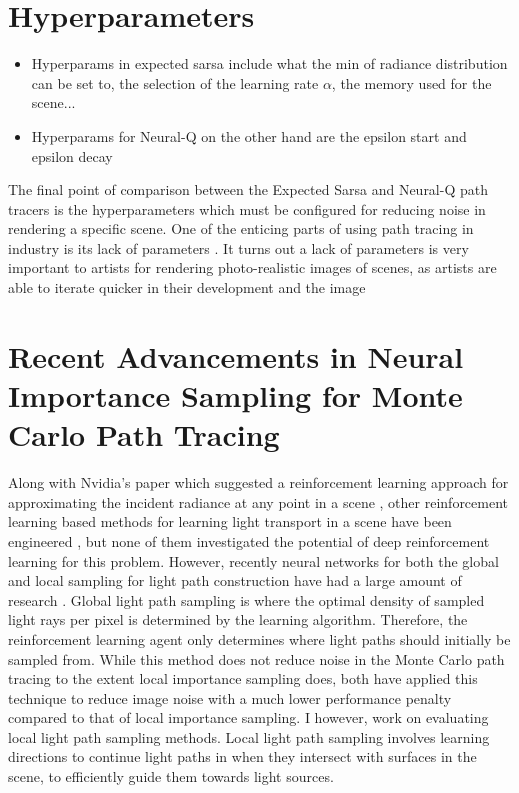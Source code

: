 \documentclass[../dissertation.tex]{subfiles}
\begin{document}
\section{Hyperparameters}
\begin{itemize}
\item Hyperparams in expected sarsa include what the min of radiance distribution can be set to, the selection of the learning rate $\alpha$, the memory used for the scene...
\item Hyperparams for Neural-Q on the other hand are the epsilon start and epsilon decay
\end{itemize}

The final point of comparison between the Expected Sarsa and Neural-Q path tracers is the hyperparameters which must be configured for reducing noise in rendering a specific scene. One of the enticing parts of using path tracing in industry is its lack of parameters \cite{georgiev2018arnold}. It turns out a lack of parameters is very important to artists for rendering photo-realistic images of scenes, as artists are able to iterate quicker in their development and the image 

\section{Recent Advancements in Neural Importance Sampling for Monte Carlo Path Tracing}
\label{sec:recent_advancements}


Along with Nvidia's paper which suggested a reinforcement learning approach for approximating the incident radiance at any point in a scene \cite{dahm2017learning}, other reinforcement learning based methods for learning light transport in a scene have been engineered \cite{muller2017practical, vorba2014line}, but none of them investigated the potential of deep reinforcement learning for this problem. However, recently neural networks for both the global and local sampling for light path construction have had a large amount of research \cite{zheng2018learning, muller2018neural, keller2019integral, hermosilla2018deep}. Global light path sampling is where the optimal density of sampled light rays per pixel is determined by the learning algorithm. Therefore, the reinforcement learning agent only determines where light paths should initially be sampled from. While this method does not reduce noise in the Monte Carlo path tracing to the extent local importance sampling does, both \cite{muller2017practical, zheng2018learning} have applied this technique to reduce image noise with a much lower performance penalty compared to that of local importance sampling. I however, work on evaluating local light path sampling methods. Local light path sampling involves learning directions to continue light paths in when they intersect with surfaces in the scene, to efficiently guide them towards light sources.\\
\end{document}
